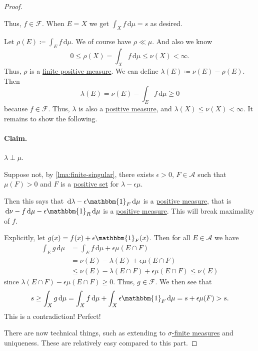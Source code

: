 \begin{proof}
\begin{enumerate}
\begin{mdframed}[skipabove=0.1in,skipbelow=0.1in]
			      Thus, \(f \in \mathscr{F}\). When \(E = X\) we get \(\int_X f \,\mathrm{d} \mu = s\) as desired.
		      \end{mdframed}

		      Let \(\rho(E) \coloneqq \int_E f \,\mathrm{d} \mu\). We of course have \(\rho \ll \mu\). And also we know
		      \[
			      0 \leq \rho(X) = \int_X f \,\mathrm{d} \mu \leq \nu(X) < \infty.
		      \]
		      Thus, \(\rho\) is a \hyperref[def:finite-signed-measure]{finite positive measure}. We can define \(\lambda(E) \coloneqq \nu(E) - \rho(E)\). Then
		      \[
			      \lambda(E) = \nu(E) - \int_E f \,\mathrm{d} \mu \geq 0
		      \]
		      because \(f \in \mathscr{F}\). Thus, \(\lambda\) is also a \hyperref[def:signed-measure]{positive measure}, and \(\lambda(X) \leq \nu(X) < \infty\).
		      It remains to show the following.

		      \paragraph{Claim.} \(\lambda \perp \mu\).
		      \begin{mdframed}[skipabove=0.1in,skipbelow=0.1in]
			      Suppose not, by \autoref{lma:finite-singular}, there exists \(\epsilon > 0\), \(F \in \mathcal{A}\) such that \(\mu(F) > 0\) and \(F\) is a
			      \hyperref[def:positive-set-for-a-signed-measure]{positive set} for \(\lambda - \epsilon \mu\).

			      Then this says that \(\,\mathrm{d} \lambda - \epsilon \mathbbm{1}_{F} \,\mathrm{d} \mu\) is a \hyperref[def:signed-measure]{positive measure}, that is
			      \(\,\mathrm{d} \nu - f \,\mathrm{d} \mu - \epsilon \mathbbm{1}_{R} \,\mathrm{d} \mu\) is a \hyperref[def:signed-measure]{positive measure}.
			      This will break maximality of \(f\).

			      Explicitly, let \(g(x) = f(x) + \epsilon \mathbbm{1}_{F} (x)\). Then for all \(E \in \mathcal{A}\) we have
			      \[
				      \begin{split}
					      \int_E g \,\mathrm{d} \mu & = \int_E f \,\mathrm{d} \mu + \epsilon\mu(E \cap F)                 \\
					      & = \nu(E) - \lambda(E) + \epsilon \mu(E \cap F)                      \\
					      & \leq \nu(E) - \lambda(E \cap F) + \epsilon\mu(E \cap F) \leq \nu(E)
				      \end{split}
			      \]
			      since \(\lambda(E \cap F) - \epsilon\mu(E \cap F) \geq 0\). Thus, \(g \in \mathscr{F}\). We then see that
			      \[
				      s \geq \int_X g \,\mathrm{d} \mu  = \int_X f \,\mathrm{d} \mu + \int_X \epsilon \mathbbm{1}_{F} \,\mathrm{d} \mu = s + \epsilon\mu(F) > s.
			      \]
			      This is a contradiction! Perfect!
		      \end{mdframed}
	\end{enumerate}
	There are now technical things, such as extending to \hyperref[def:finite-signed-measure]{\(\sigma\)-finite measures} and uniqueness. These are relatively easy compared to this part.
\end{proof}

